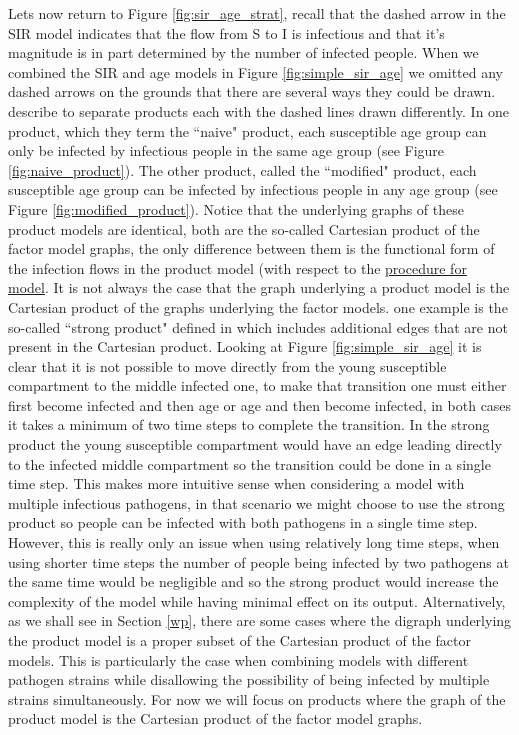 Lets now return to Figure \ref{fig:sir_age_strat}, recall that the dashed arrow in the SIR model indicates that the flow from S to I is infectious and that it's magnitude is in part determined by the number of infected people. When we combined the SIR and age models in Figure \ref{fig:simple_sir_age} we omitted any dashed arrows on the grounds that there are several ways they could be drawn. \cite{worden2017products} describe to separate products each with the dashed lines drawn differently. In one product, which they term the ``naive" product, each susceptible age group can only be infected by infectious people in the same age group (see Figure \ref{fig:naive_product}). The other product, called the ``modified" product, each susceptible age group can be infected by infectious people in any age group (see Figure \ref{fig:modified_product}). Notice that the underlying graphs of these product models are identical, both are the so-called Cartesian product of the factor model graphs, the only difference between them is the functional form of the infection flows in the product model (with respect to the \hyperref[genproc]{procedure for model}. It is not always the case that the graph underlying a product model is the Cartesian product of the graphs underlying the factor models. one example is the so-called ``strong product" defined in \cite{worden2017products} which includes additional edges that are not present in the Cartesian product. Looking at Figure \ref{fig:simple_sir_age} it is clear that it is not possible to move directly from the young susceptible compartment to the middle infected one, to make that transition one must either first become infected and then age or age and then become infected, in both cases it takes a minimum of two time steps to complete the transition. In the strong product the young susceptible compartment would have an edge leading directly to the infected middle compartment so the transition could be done in a single time step. This makes more intuitive sense when considering a model with multiple infectious pathogens, in that scenario we might choose to use the strong product so people can be infected with both pathogens in a single time step. However, this is really only an issue when using relatively long time steps, when using shorter time steps the number of people being infected by two pathogens at the same time would be negligible and so the strong product would increase the complexity of the model while having minimal effect on its output. Alternatively, as we shall see in Section \ref{wp}, there are some cases where the digraph underlying the product model is a proper subset of the Cartesian product of the factor models. This is particularly the case when combining models with different pathogen strains while disallowing the possibility of being infected by multiple strains simultaneously. For now we will focus on products where the graph of the product model is the Cartesian product of the factor model graphs.

